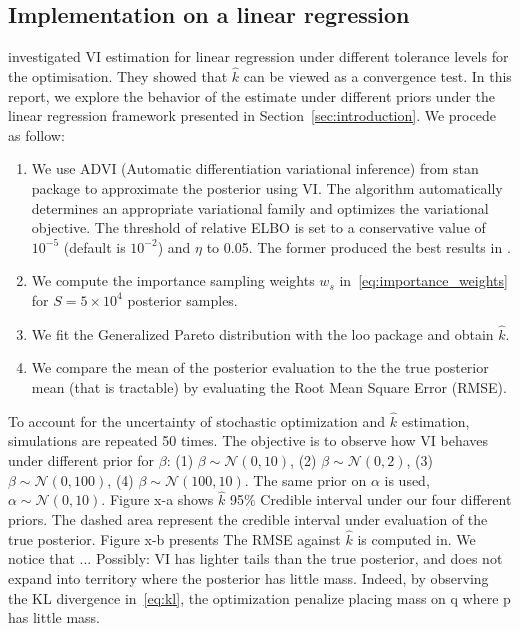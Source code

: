 \documentclass[twoside]{article}
\begin{document}
\subsection{Implementation on a linear regression}
\citet{2018arXiv180202538Y} investigated VI estimation for linear regression under different tolerance levels for the optimisation. They showed that $\hat{k}$ can be viewed as a convergence test. In this report, we explore the behavior of the estimate under different priors under the linear regression framework presented in Section~\ref{sec:introduction}. We procede as follow: 
\begin{enumerate}
    \item We use {\selectfont ADVI} (Automatic differentiation variational inference) from {\selectfont stan} package \citep{2015arXiv150603431K} to approximate the posterior using VI. The algorithm automatically determines an appropriate variational family and optimizes the variational objective. The threshold of relative ELBO is set to a conservative value of $10^{-5}$ (default is $10^{-2}$) and $\eta$ to 0.05. The former produced the best results in \citet{2018arXiv180202538Y}.
    \item We compute the importance sampling weights $w_s$ in~\eqref{eq:importance_weights} for $S = 5 \times 10^4$ posterior samples.
    \item We fit the Generalized Pareto distribution with the {\selectfont loo} package \citep{Vehtari:2017aa,2015arXiv150702646V} and obtain $\hat{k}$.
    \item We compare the mean of the posterior evaluation to the the true posterior mean (that is tractable) by evaluating the Root Mean Square Error (RMSE).
\end{enumerate}
To account for the uncertainty of stochastic optimization and $\hat{k}$ estimation, simulations are repeated 50 times.
The objective is to observe how VI behaves under different prior for $\beta$: (1) $\beta \sim \mathcal{N}(0,10)$, (2) $\beta \sim \mathcal{N}(0,2)$, (3) $\beta \sim \mathcal{N}(0,100)$, (4) $\beta \sim \mathcal{N}(100,10)$. The same prior on $\alpha$ is used, $\alpha \sim \mathcal{N}(0,10)$. Figure x-a shows $\hat{k}$ 95\% Credible interval under our four different priors. The dashed area represent the credible interval under evaluation of the true posterior.  Figure x-b presents The RMSE against $\hat{k}$ is computed in. We notice that ...
Possibly:
VI has lighter tails than the true posterior, and does not expand into territory where the posterior has little mass. Indeed, by observing the KL divergence in~\eqref{eq:kl},  the optimization penalize placing mass on q where p has little mass. 
\end{document}
